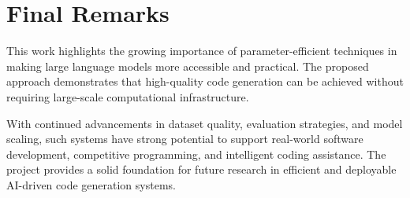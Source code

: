 \section{Final Remarks}

This work highlights the growing importance of parameter-efficient techniques in making large language models more accessible and practical. The proposed approach demonstrates that high-quality code generation can be achieved without requiring large-scale computational infrastructure.

With continued advancements in dataset quality, evaluation strategies, and model scaling, such systems have strong potential to support real-world software development, competitive programming, and intelligent coding assistance. The project provides a solid foundation for future research in efficient and deployable AI-driven code generation systems.